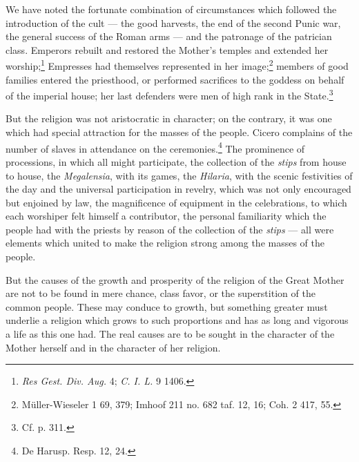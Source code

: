 \documentclass[a4paper, 11pt, oneside, polutonikogreek, english]{article}
\begin{document}
We have noted the fortunate combination of circumstances which followed the introduction of the cult --- the good harvests, the end of the second Punic war, the general success of the Roman arms --- and the patronage of the patrician class. Emperors rebuilt and restored the Mother's temples and extended her worship;\footnote{\emph{Res Gest. Div. Aug.} 4; \emph{C. I. L.} 9 1406.} Empresses had themselves represented in her image;\footnote{Müller-Wieseler 1 69, 379; Imhoof 211 no. 682 taf. 12, 16; Coh. 2 417, 55.} members of good families entered the priesthood, or performed sacrifices to the goddess on behalf of the imperial house; her last defenders were men of high rank in the State.\footnote{Cf. p. 311.}

But the religion was not aristocratic in character; on the contrary, it was one which had special attraction for the masses of the people. Cicero complains of the number of slaves in attendance on the ceremonies.\footnote{De Harusp. Resp. 12, 24.} The prominence of processions, in which all might participate, the collection of the \emph{stips} from house to house, the \emph{Megalensia}, with its games, the \emph{Hilaria}, with the scenic festivities of the day and the universal participation in revelry, which was not only encouraged but enjoined by law, the magnificence of equipment in the celebrations, to which each worshiper felt himself a contributor, the personal familiarity which the people had with the priests by reason of the collection of the \emph{stips} --- all were elements which united to make the religion strong among the masses of the people.

But the causes of the growth and prosperity of the religion of the Great Mother are not to be found in mere chance, class favor, or the superstition of the common people. These may conduce to growth, but something greater must underlie a religion which grows to such proportions and has as long and vigorous a life as this one had. The real causes are to be sought in the character of the Mother herself and in the character of her religion.
\end{document}
